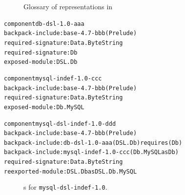 \begin{figure}
\begin{mdframed}
\begin{description}
\end{description}
\caption{Glossary of representations in \Backpack{}}
\label{fig:glossary}
\end{mdframed}
\end{figure}

\newsavebox{\resolvedfullexample}
\begin{lrbox}{\resolvedfullexample}
\hspace{-1em}
\begin{minipage}{\linewidth}
\begin{alltt}
component db-dsl-1.0-aaa
 backpack-include: base-4.7-bbb (Prelude)
 required-signature: Data.ByteString
 required-signature: Db
 exposed-module: DSL.Db

component mysql-indef-1.0-ccc
 backpack-include: base-4.7-bbb (Prelude)
 required-signature: Data.ByteString
 exposed-module: Db.MySQL

component mysql-dsl-indef-1.0-ddd
 backpack-include: base-4.7-bbb (Prelude)
 backpack-include: db-dsl-1.0-aaa (DSL.Db) requires (Db)
 backpack-include: mysql-indef-1.0-ccc (Db.MySQL as Db)
 required-signature: Data.ByteString
 reexported-module: DSL.Db as DSL.Db.MySQL
\end{alltt}
\end{minipage}
\end{lrbox}

\begin{figure}
    \usebox{\resolvedfullexample}
  \caption{\Ccomp{}s for \texttt{mysql-dsl-indef-1.0}.}%
\label{fig:resolved-full-comps}
\end{figure}



